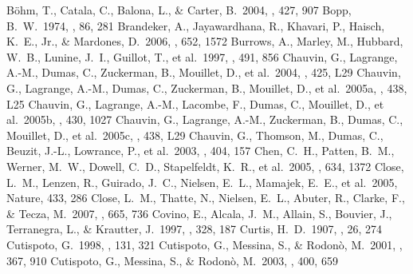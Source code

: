 \documentclass[11pt,twoside]{book}
\begin{document}
\begin{thebibliography}{}
B{\"o}hm, T., Catala, C., Balona, L., \& Carter, B.\ 2004, \aap, 427, 907
Bopp, B.~W.\ 1974, \pasp, 86, 281
Brandeker, A., Jayawardhana, R., Khavari, P., Haisch, K.~E., Jr., \& Mardones,
D.\ 2006, \apj, 652, 1572
Burrows, A., {Marley}, M., {Hubbard}, W.~B., {Lunine}, J.~I., {Guillot}, T.,
et al.\ 1997, \apj, 491, 856
Chauvin, G., Lagrange, A.-M., Dumas, C., Zuckerman, B., Mouillet, D.,
et al.\ 2004, \aap, 425, L29
Chauvin, G., Lagrange, A.-M., Dumas, C., Zuckerman, B., Mouillet, D.,
et al.\ 2005a, \aap, 438, L25
Chauvin, G., Lagrange, A.-M., Lacombe, F., Dumas, C., Mouillet, D.,
et al.\ 2005b, \aap, 430, 1027
Chauvin, G., {Lagrange}, A.-M., {Zuckerman}, B., {Dumas}, C., {Mouillet}, D.,
et al.\ 2005c, \aap, 438, L29
Chauvin, G., Thomson, M., Dumas, C., Beuzit, J.-L., Lowrance, P.,  et al.\ 2003, \aap, 404, 157
Chen, C.~H., {Patten}, B.~M., {Werner}, M.~W., {Dowell}, C.~D., {Stapelfeldt},
K.~R.,
et al.\ 2005, \apj, 634, 1372
Close, L.~M., Lenzen, R., {Guirado}, J.~C., {Nielsen}, E.~L., {Mamajek}, E.~E.,
et al.\ 2005, Nature, 433, 286
Close, L.~M., Thatte, N., Nielsen, E.~L., Abuter, R., Clarke, F., \& Tecza, M.\
2007, \apj, 665, 736
Covino, E., Alcala, J.~M., Allain, S., Bouvier, J., Terranegra, L., \& Krautter,
J.\ 1997, \aap, 328, 187
Curtis, H.~D.\ 1907, \apj, 26, 274
Cutispoto, G.\ 1998, \aaps, 131, 321
Cutispoto, G., Messina, S., \& Rodon{\`o}, M.\ 2001, \aap, 367, 910
\bibitem[Cutispoto et al.(2003)]{cutispoto03}
Cutispoto, G., Messina, S., \& Rodon{\`o}, M.\ 2003, \aap, 400, 659
\bibitem[Cutispoto et al.(2002)]{cutispoto02}

\end{thebibliography}
\end{document}
